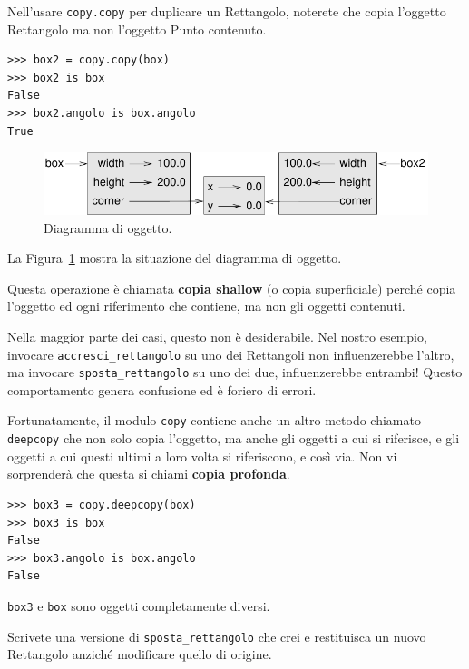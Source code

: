 \documentclass[10pt]{book}
\begin{document}
Nell'usare {\tt copy.copy} per duplicare un Rettangolo, noterete che copia l'oggetto Rettangolo ma non l'oggetto Punto contenuto.

\begin{verbatim}
>>> box2 = copy.copy(box)
>>> box2 is box
False
>>> box2.angolo is box.angolo
True
\end{verbatim}

\begin{figure}
\centerline
{\includegraphics[scale=0.8]{figs/rectangle2.pdf}}
\caption{Diagramma di oggetto.}
\label{fig.rectangle2}
\end{figure}

La Figura~\ref{fig.rectangle2} mostra la situazione del diagramma di oggetto.

Questa operazione è chiamata {\bf copia shallow} (o copia superficiale) perché copia l'oggetto ed ogni riferimento che contiene, ma non gli oggetti contenuti.

Nella maggior parte dei casi, questo non è desiderabile. Nel nostro esempio, invocare \verb"accresci_rettangolo" su uno dei Rettangoli non influenzerebbe l'altro, ma invocare \verb"sposta_rettangolo" su uno dei due, influenzerebbe entrambi! Questo comportamento genera confusione ed è foriero di errori.

Fortunatamente, il modulo {\tt copy} contiene anche un altro metodo chiamato {\tt
deepcopy} che non solo copia l'oggetto, ma anche gli oggetti a cui si riferisce, e gli oggetti a cui questi ultimi a loro volta si riferiscono, e così via. Non vi sorprenderà che questa si chiami {\bf copia profonda}.

\begin{verbatim}
>>> box3 = copy.deepcopy(box)
>>> box3 is box
False
>>> box3.angolo is box.angolo
False
\end{verbatim}
%
{\tt box3} e {\tt box} sono oggetti completamente diversi.

\vspace{0.2in}
\begin{exercise}

Scrivete una versione di \verb"sposta_rettangolo" che crei e restituisca un nuovo Rettangolo anziché modificare quello di origine.

\end{exercise}
\end{document}
